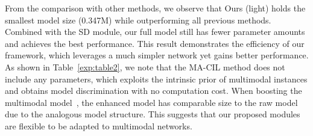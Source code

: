 \documentclass[sigconf]{acmart}
\begin{document}
From the comparison with other methods, we observe that Ours (light) holds the smallest model size (0.347M) while outperforming all previous methods. Combined with the SD module, our full model still has fewer parameter amounts and achieves the best performance. This result demonstrates the efficiency of our framework, which leverages a much simpler network yet gains better performance. As shown in Table~\ref{exp:table2}, we note that the MA-CIL method does not include any parameters, which exploits the intrinsic prior of multimodal instances and obtains model discrimination with no computation cost. When boosting the multimodal model~\cite{pang2021violence}, the enhanced model has comparable size to the raw model due to the analogous model structure. This suggests that our proposed modules are flexible to be adapted to multimodal networks.

\begin{table}[htbp]
\caption{Ablation study for the hyperparameters in the proposed modality-aware contrastive instance learning.}
\end{table}
\end{document}
